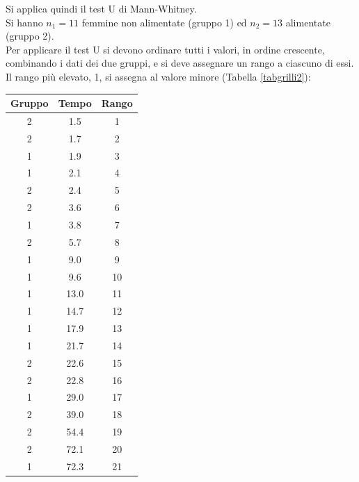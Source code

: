 \documentclass[10pt, draft]{book}
\newcounter{example}[section]
\begin{document}
\begin{example}
    Si applica quindi il test U di Mann-Whitney.\\
    Si hanno $n_1 = 11$ femmine non alimentate (gruppo 1) ed $n_2 = 13$ alimentate (gruppo 2).\\
    Per applicare il test U si devono ordinare tutti i valori, in ordine crescente, combinando i dati dei due gruppi, e si deve assegnare un rango a ciascuno di essi. Il rango più elevato, 1, si assegna al valore minore (Tabella \ref{tabgrilli2}):
    \begin{table}[H]
        \centering
        \renewcommand\arraystretch{1.2}
        \begin{tabular}{c|c|c}
        \textbf{Gruppo} & \textbf{Tempo} & \textbf{Rango}\\ 
        \hline
        2 & \color{red}1.5 & \color{red}1\\
        \hline
        2 & \color{red}1.7 & \color{red}2\\
        \hline
        1 & 1.9 & 3\\
        \hline
        1 & 2.1 & 4\\
        \hline
        2 & \color{red}2.4 & \color{red}5\\
        \hline
        2 & \color{red}3.6 & \color{red}6\\
        \hline
        1 & 3.8 & 7\\
        \hline
        2 & \color{red}5.7 & \color{red}8\\
        \hline
        1 & 9.0 & 9\\
        \hline
        1 & 9.6 & 10\\
        \hline
        1 & 13.0 & 11\\
        \hline
        1 & 14.7 & 12\\
        \hline
        1 & 17.9 & 13\\
        \hline
        1 & 21.7 & 14\\
        \hline
        2 & \color{red}22.6 & \color{red}15\\
        \hline
        2 & \color{red}22.8 & \color{red}16\\
        \hline
        1 & 29.0 & 17\\
        \hline
        2 & \color{red}39.0 & \color{red}18\\
        \hline
        2 & \color{red}54.4 & \color{red}19\\
        \hline
        2 & \color{red}72.1 & \color{red}20\\
        \hline
        1 & 72.3 & 21\\

\end{tabular}
\end{table}
\end{example}
\end{document}
